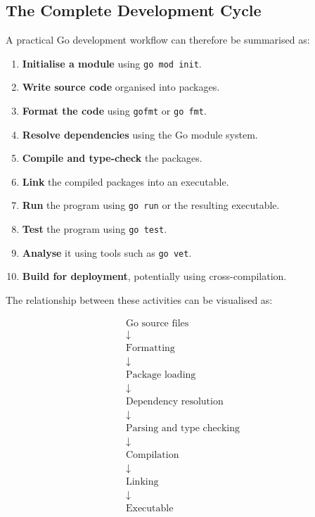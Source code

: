 \subsection{The Complete Development Cycle}

A practical Go development workflow can therefore be summarised as:

\begin{enumerate}
    \item \textbf{Initialise a module} using \texttt{go mod init}.
    \item \textbf{Write source code} organised into packages.
    \item \textbf{Format the code} using \texttt{gofmt} or
          \texttt{go fmt}.
    \item \textbf{Resolve dependencies} using the Go module system.
    \item \textbf{Compile and type-check} the packages.
    \item \textbf{Link} the compiled packages into an executable.
    \item \textbf{Run} the program using \texttt{go run} or the
          resulting executable.
    \item \textbf{Test} the program using \texttt{go test}.
    \item \textbf{Analyse} it using tools such as \texttt{go vet}.
    \item \textbf{Build for deployment}, potentially using
          cross-compilation.
\end{enumerate}

The relationship between these activities can be visualised as:

\[
\boxed{
\begin{array}{c}
\text{Go source files}\\
\downarrow\\
\text{Formatting}\\
\downarrow\\
\text{Package loading}\\
\downarrow\\
\text{Dependency resolution}\\
\downarrow\\
\text{Parsing and type checking}\\
\downarrow\\
\text{Compilation}\\
\downarrow\\
\text{Linking}\\
\downarrow\\
\text{Executable}
\end{array}}
\]

